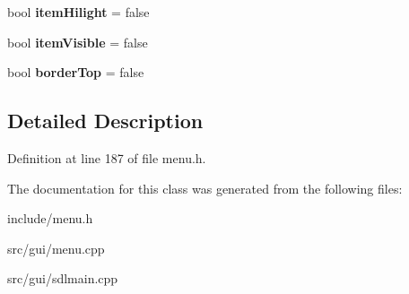 \begin{DoxyCompactItemize}
\item 
\hypertarget{classDOSBoxMenu_1_1item_a2b8eab8d5482b72838f3282c902ebfe2}{bool {\bfseries item\-Hilight} = false}\label{classDOSBoxMenu_1_1item_a2b8eab8d5482b72838f3282c902ebfe2}

\item 
\hypertarget{classDOSBoxMenu_1_1item_a2c014c3c82d5539dcb01c81adac12bee}{bool {\bfseries item\-Visible} = false}\label{classDOSBoxMenu_1_1item_a2c014c3c82d5539dcb01c81adac12bee}

\item 
\hypertarget{classDOSBoxMenu_1_1item_a67eac7d4b03df9509fd907343577c6c5}{bool {\bfseries border\-Top} = false}\label{classDOSBoxMenu_1_1item_a67eac7d4b03df9509fd907343577c6c5}

\end{DoxyCompactItemize}


\subsection{Detailed Description}


Definition at line 187 of file menu.\-h.



The documentation for this class was generated from the following files\-:\begin{DoxyCompactItemize}
\item 
include/menu.\-h\item 
src/gui/menu.\-cpp\item 
src/gui/sdlmain.\-cpp\end{DoxyCompactItemize}
